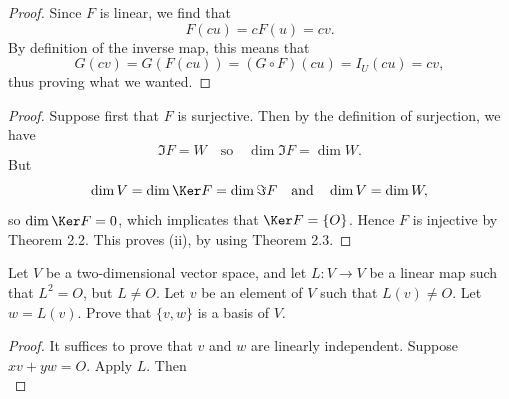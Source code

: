 {{\begin{solution}
{\begin{proof}
            Since $F$ is linear, we find that 
            \begin{equation*}
                F(cu) = cF(u) = cv. 
            \end{equation*}
            By definition of the inverse map, this means that 
            \begin{equation*}
                G(cv) = G(F(cu)) = (G \circ F)(cu) = I_U(cu) = cv, 
            \end{equation*}
            thus proving what we wanted. 
        \end{proof}
        \item 
        \begin{proof}
            Suppose first that $F$ is surjective. 
            Then by the definition of surjection, we have 
            \begin{equation*}
                \Im F = W \quad \text{so} \quad \dim \Im F = \dim W. 
            \end{equation*}
            But
            \begin{equation*}
                \dim V = \dim \Ker F = \dim \Im F \quad \text{and} \quad \dim V = \dim W, 
            \end{equation*}
            so $\dim \Ker F = 0$, which implicates that $\Ker F = \{ O \}$. 
            Hence $F$ is injective by Theorem 2.2. 
            This proves (ii), by using Theorem 2.3. 
        \end{proof}
    }
    \end{solution}
    \item 
    \item 
    \item 
    \item 
    \item 
    \item 
    \item 
    \item 
    \item 
    Let $V$ be a two-dimensional vector space, and let $L: V \to V$ be a linear map such that $L^2 = O$, but $L \neq O$. 
    Let $v$ be an element of $V$ such that $L(v) \neq O$. 
    Let $w = L(v)$. 
    Prove that $\{ v, w \}$ is a basis of $V$. 
    \begin{Solution}
        \begin{proof}
            It suffices to prove that $v$ and $w$ are linearly independent. 
            Suppose $xv + yw = O$. 
            Apply $L$. 
            Then 
            \begin{equation*}

\end{equation*}
\end{proof}
\end{Solution}}}
